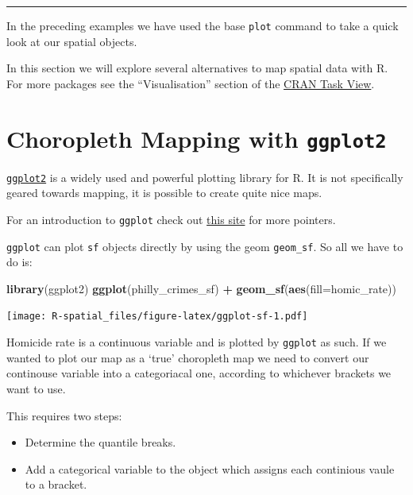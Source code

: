 \documentclass[
]{book}
\newenvironment{Shaded}{\begin{snugshade}}{\end{snugshade}}
\newcommand{\AttributeTok}[1]{\textcolor[rgb]{0.13,0.29,0.53}{#1}}
\newcommand{\FunctionTok}[1]{\textcolor[rgb]{0.13,0.29,0.53}{\textbf{#1}}}
\newcommand{\NormalTok}[1]{#1}
\newcommand{\SpecialCharTok}[1]{\textcolor[rgb]{0.81,0.36,0.00}{\textbf{#1}}}
\providecommand{\tightlist}{%
  \setlength{\itemsep}{0pt}\setlength{\parskip}{0pt}}
\begin{document}
\begin{center}\rule{0.5\linewidth}{0.5pt}\end{center}

In the preceding examples we have used the base \texttt{plot} command to take a quick look at our spatial objects.

In this section we will explore several alternatives to map spatial data with R. For more packages see the ``Visualisation'' section of the \href{https://cran.r-project.org/web/views/Spatial.html}{CRAN Task View}.

\hypertarget{choropleth-mapping-with-ggplot2}{%
\section{\texorpdfstring{Choropleth Mapping with \texttt{ggplot2}}{Choropleth Mapping with ggplot2}}\label{choropleth-mapping-with-ggplot2}}

\href{http://ggplot2.org/}{\texttt{ggplot2}} is a widely used and powerful plotting library for R. It is not specifically geared towards mapping, it is possible to create quite nice maps.

For an introduction to \texttt{ggplot} check out \href{http://ggplot2.tidyverse.org/}{this site} for more pointers.

\texttt{ggplot} can plot \texttt{sf} objects directly by using the geom \texttt{geom\_sf}. So all we have to do is:

\begin{Shaded}
\begin{Highlighting}[]
\FunctionTok{library}\NormalTok{(ggplot2)}
\FunctionTok{ggplot}\NormalTok{(philly\_crimes\_sf) }\SpecialCharTok{+} 
  \FunctionTok{geom\_sf}\NormalTok{(}\FunctionTok{aes}\NormalTok{(}\AttributeTok{fill=}\NormalTok{homic\_rate))}
\end{Highlighting}
\end{Shaded}

\texttt{[image: R-spatial\_files/figure-latex/ggplot-sf-1.pdf]}

Homicide rate is a continuous variable and is plotted by \texttt{ggplot} as such. If we wanted to plot our map as a `true' choropleth map we need to convert our continouse variable into a categoriacal one, according to whichever brackets we want to use.

This requires two steps:

\begin{itemize}
\tightlist
\item
  Determine the quantile breaks.
\item
  Add a categorical variable to the object which assigns each continious vaule to a bracket.
\end{itemize}
\end{document}
